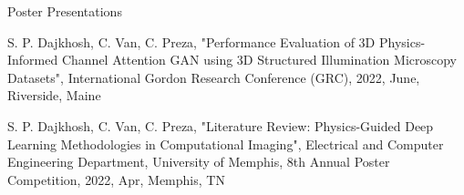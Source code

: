 

\begin{cventries}

  
  \cventry
    {} %
    {Poster Presentations} %
    {} %
    {} %
    {
      \begin{cvitems} %
        \item{S. P. Dajkhosh, C. Van, C. Preza, "Performance Evaluation of 3D Physics-Informed Channel Attention GAN using 3D Structured Illumination Microscopy Datasets", International Gordon Research Conference (GRC), 2022, June, Riverside, Maine}
        \item{S. P. Dajkhosh, C. Van, C. Preza, "Literature Review: Physics-Guided Deep Learning Methodologies in Computational Imaging", Electrical and Computer Engineering Department, University of Memphis, 8th Annual Poster Competition, 2022, Apr, Memphis, TN}
      \end{cvitems}
    }
  

\end{cventries}
